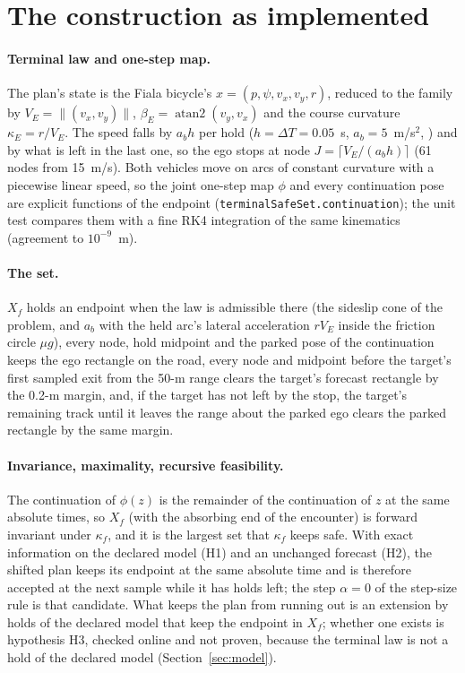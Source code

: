 \documentclass[11pt]{article}
\begin{document}
\section{The construction as implemented}
\paragraph{Terminal law and one-step map.}
The plan's state is the Fiala bicycle's $x=(p,\psi,v_x,v_y,r)$, reduced to the
family by $V_E=\lVert(v_x,v_y)\rVert$, $\beta_E=\operatorname{atan2}(v_y,v_x)$
and the course curvature $\kappa_E=r/V_E$. The speed falls by $a_bh$ per hold
($h=\Delta T=0.05$~s, $a_b=5$~m/s$^2$,
) and by what is
left in the last one, so the ego stops at node $J=\lceil V_E/(a_bh)\rceil$
(61 nodes from 15~m/s). Both vehicles move on arcs of constant curvature with
a piecewise linear speed, so the joint one-step map $\phi$ and every
continuation pose are explicit functions of the endpoint
(\texttt{terminalSafeSet.continuation}); the unit test compares them with a
fine RK4 integration of the same kinematics (agreement to $10^{-9}$~m).

\paragraph{The set.}
$X_f$ holds an endpoint when the law is admissible there (the sideslip cone
of the problem, and $a_b$ with the held arc's lateral acceleration $rV_E$
inside the friction circle $\mu g$), every node, hold midpoint and the parked
pose of the continuation keeps the ego rectangle on the road, every node and
midpoint before the target's first sampled exit from the 50-m range clears
the target's forecast rectangle by the 0.2-m margin, and, if the target has
not left by the stop, the target's remaining track until it leaves the range
about the parked ego clears the parked rectangle by the same margin.

\paragraph{Invariance, maximality, recursive feasibility.}
The continuation of $\phi(z)$ is the remainder of the continuation of $z$ at
the same absolute times, so $X_f$ (with the absorbing end of the encounter) is
forward invariant under $\kappa_f$, and it is the largest set that $\kappa_f$
keeps safe. With exact information on the declared model (H1) and an
unchanged forecast (H2), the shifted plan keeps its endpoint at the same
absolute time and is therefore accepted at the next sample while it has holds
left; the step $\alpha=0$ of the step-size rule is that candidate. What keeps
the plan from running out is an extension by holds of the declared model that
keep the endpoint in $X_f$; whether one exists is hypothesis H3, checked
online and not proven, because the terminal law is not a hold of the declared
model (Section~\ref{sec:model}).
\end{document}
